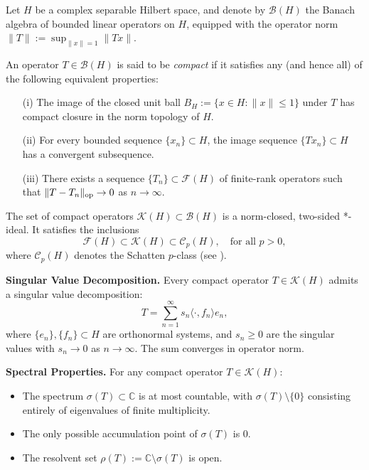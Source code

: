 \begin{definition}\label{def:compact_operator}
Let \( H \) be a complex separable Hilbert space, and denote by \( \mathcal{B}(H) \) the Banach algebra of bounded linear operators on \( H \), equipped with the operator norm \( \|T\| := \sup_{\|x\| = 1} \|Tx\| \).

An operator \( T \in \mathcal{B}(H) \) is said to be \emph{compact} if it satisfies any (and hence all) of the following equivalent properties:
\begin{enumerate}
    \item[\textup{(i)}] The image of the closed unit ball \( B_H := \{ x \in H : \|x\| \leq 1 \} \) under \( T \) has compact closure in the norm topology of \( H \).
    \item[\textup{(ii)}] For every bounded sequence \( \{x_n\} \subset H \), the image sequence \( \{Tx_n\} \subset H \) has a convergent subsequence.
    \item[\textup{(iii)}] There exists a sequence \( \{T_n\} \subset \mathcal{F}(H) \) of finite-rank operators such that \( \|T - T_n\|_{\mathrm{op}} \to 0 \) as \( n \to \infty \).
\end{enumerate}

The set of compact operators \( \mathcal{K}(H) \subset \mathcal{B}(H) \) is a norm-closed, two-sided *-ideal. It satisfies the inclusions
\[
\mathcal{F}(H) \subset \mathcal{K}(H) \subset \mathcal{C}_p(H), \quad \text{for all } p > 0,
\]
where \( \mathcal{C}_p(H) \) denotes the Schatten \( p \)-class (see ).

\medskip
\noindent\textbf{Singular Value Decomposition.}
Every compact operator \( T \in \mathcal{K}(H) \) admits a singular value decomposition:
\[
T = \sum_{n=1}^\infty s_n \langle \cdot, f_n \rangle e_n,
\]
where \( \{e_n\}, \{f_n\} \subset H \) are orthonormal systems, and \( s_n \geq 0 \) are the singular values with \( s_n \to 0 \) as \( n \to \infty \). The sum converges in operator norm.

\medskip
\noindent\textbf{Spectral Properties.}
For any compact operator \( T \in \mathcal{K}(H) \):
\begin{itemize}
    \item The spectrum \( \sigma(T) \subset \mathbb{C} \) is at most countable, with \( \sigma(T) \setminus \{0\} \) consisting entirely of eigenvalues of finite multiplicity.
    \item The only possible accumulation point of \( \sigma(T) \) is \( 0 \).
    \item The resolvent set \( \rho(T) := \mathbb{C} \setminus \sigma(T) \) is open.
\end{itemize}


\end{definition}
